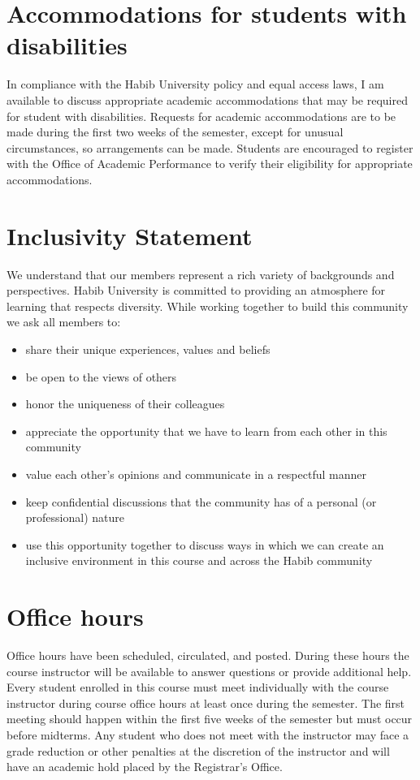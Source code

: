\documentclass[a4paper]{article}
\begin{document}
\section{Accommodations for students with disabilities}

In compliance with the Habib University policy and equal access laws, I am available to discuss appropriate academic accommodations that may be required for student with disabilities. Requests for academic accommodations are to be made during the first two weeks of the semester, except for unusual circumstances, so arrangements can be made. Students are encouraged to register with the Office of Academic Performance to verify their eligibility for appropriate accommodations.

\section{Inclusivity Statement}
We understand that our members represent a rich variety of backgrounds and perspectives. Habib University is committed to providing an atmosphere for learning that respects diversity. While working together to build this community we ask all members to:
\begin{itemize}
	\item share their unique experiences, values and beliefs
	\item be open to the views of others 
	\item honor the uniqueness of their colleagues
	\item appreciate the opportunity that we have to learn from each other in this community
	\item value each other's opinions and communicate in a respectful manner
	\item keep confidential discussions that the community has of a personal (or professional) nature 
	\item use this opportunity together to discuss ways in which we can create an inclusive environment in this course and across the Habib community 
\end{itemize}

\section{Office hours}
Office hours have been scheduled, circulated, and posted.  During these hours the course instructor will be available to answer questions or provide additional help. Every student enrolled in this course must meet individually with the course instructor during course office hours at least once during the semester. The first meeting should happen within the first five weeks of the semester but must occur before midterms. Any student who does not meet with the instructor may face a grade reduction or other penalties at the discretion of the instructor and will have an academic hold placed by the Registrar's Office. 
\end{document}
